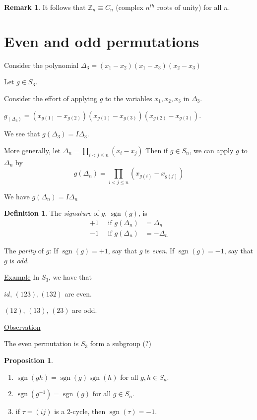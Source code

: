 \documentclass{article}
\theoremstyle{definition}
\newtheorem{definition}{Definition}[section]
\newtheorem{proposition}{Proposition}
\newtheorem*{remark}{Remark}
\newcommand{\dtn}{\Delta_n}
\DeclareMathOperator{\sgn}{sgn}
\begin{document}
\begin{remark}
  It follows that $\mathbb{Z}_n \equiv C_n$ (complex $n^{th}$ roots of unity) for all $n$.
\end{remark}

\section{Even and odd permutations}

Consider the polynomial $\Delta_3 = (x_1 - x_2)(x_1 - x_3) (x_2 - x_3)$

Let $g \in S_3$.

Consider the effort of applying $g$ to the variables $x_1, x_2, x_3$ in $\Delta_3$.

$g_(\Delta_3) = (x_{g(1)} - x_{g(2)})(x_{g(1)} - x_{g(3)})(x_{g(2)} - x_{g(3)})$. 

We see that $g(\Delta_3)=I\Delta_3$.

More generally, let $\Delta_n = \prod_{i<j\leq n} (x_i - x_j ) $ Then if $g \in S_n$, we can apply $g$ to $\Delta_n$ by 
$$g(\Delta_n) = \prod_{i<j\leq n}(x_{g(i)} - x_{g(j)})$$

We have $g(\Delta_n) = I \Delta_n$

\begin{definition}
  The \emph{signature} of $g$, $\sgn(g)$, is 
  \begin{align*}
    +1 \quad \text{ if } g(\dtn) &= \dtn \\
    -1 \quad \text{ if } g(\dtn) &= -\dtn
  \end{align*}
\end{definition}

The \emph{parity} of $g$: If $\sgn(g)=+1$, say that $g$ is \emph{even}.
If $\sgn(g)=-1$, say that $g$ is \emph{odd}.

\underline{Example}
In $S_3$, we have that 

$id,\,(1 2 3), (1 3 2)$ are even.

$(1 2),\, (1 3),\,(2 3)$ are odd.

\underline{Observation}

The even permutation is $S_3$ form a subgroup (?)

\begin{proposition}
  \label{prp:sgn}
  \begin{enumerate}
    \item $\sgn(gh)=\sgn(g)\sgn(h)$ for all $g,h \in S_n$.
    \item $\sgn(g^{-1})=\sgn(g)$ for all $g \in S_n$.
    \item if $\tau=(i j)$ is a 2-cycle, then $\sgn(\tau)=-1$.
  \end{enumerate}
\end{proposition}
\end{document}
